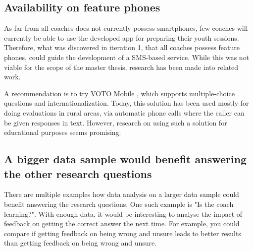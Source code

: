 \subsection{Availability on feature phones}
As far from all coaches does not currently possess smartphones, few coaches will currently be able to use the developed app for preparing their youth sessions. Therefore, what was discovered in iteration 1, that all coaches possess feature phones, could guide the development of a SMS-based service. While this was not viable for the scope of the master thesis, research has been made into related work.

A recommendation is to try VOTO Mobile \cite{voto-mobile}, which supports multiple-choice questions and internationalization. Today, this solution has been used mostly for doing evaluations in rural areas, via automatic phone calls where the caller can be given responses in text. However, research on using such a solution for educational purposes seems promising.

\subsection{A bigger data sample would benefit answering the other research questions}
There are multiple examples how data analysis on a larger data sample could benefit answering the research questions. One such example is "Is the coach learning?". With enough data, it would be interesting to analyse the impact of feedback on getting the correct answer the next time. For example, you could compare if getting feedback on being wrong and unsure leads to better results than getting feedback on being wrong and unsure.
